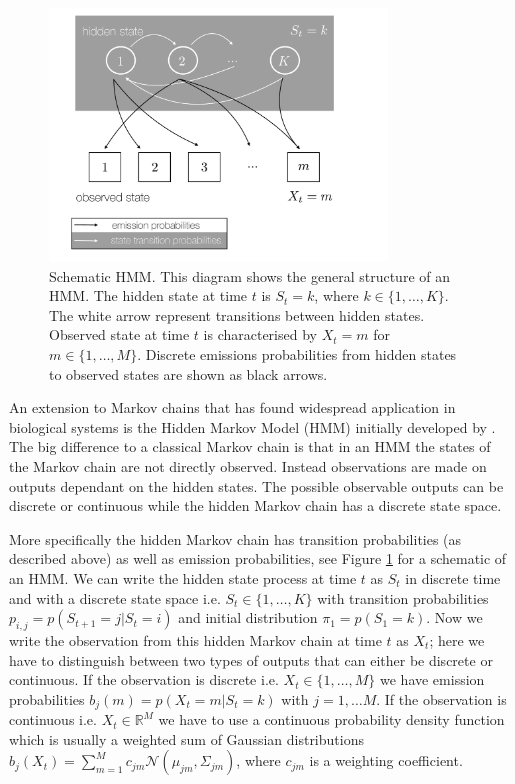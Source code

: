 \begin{figure}[!t]
\centering
\includegraphics[width=0.8\textwidth]{pics/hmm-schem.pdf}
\caption{Schematic HMM. This diagram shows the general structure of an HMM. The hidden state at time $t$ is $S_t=k$, where $k \in \{1, \ldots, K\}$. The white arrow represent transitions between hidden states. Observed state at time $t$ is characterised by $X_t =m $ for $m \in \{1, \ldots, M\}$. Discrete emissions probabilities from hidden states to observed states are shown as black arrows.}
\label{fig:hmm-schem}
\end{figure}

An extension to Markov chains that has found widespread application in biological systems is the Hidden Markov Model (HMM)  initially developed by \cite{Baum:1966cy}. The big difference to a classical Markov chain is that in an HMM the states of the Markov chain are not directly observed. Instead observations are made on outputs dependant on the hidden states. The possible observable outputs can be discrete or continuous while the hidden Markov chain has a discrete state space.

More specifically the hidden Markov chain has transition probabilities (as described above) as well as emission probabilities, see Figure \ref{fig:hmm-schem} for a schematic of an HMM. We can write the hidden state process at time $t$ as $S_t$ in discrete time and with a discrete state space i.e. $S_t \in \lbrace 1, \ldots, K \rbrace$ with transition probabilities $p_{i,j} = p(S_{t+1} =j | S_t =i)$ and initial distribution $\pi_1 = p(S_1 = k)$. Now we write the observation from this hidden Markov chain at time $t$ as $X_t$; here we have to distinguish between two types of outputs that can either be discrete or continuous. If the observation is discrete i.e. $X_t \in \lbrace 1, \ldots, M \rbrace$ we have emission probabilities  $b_j(m) = p(X_t = m | S_t = k)$ with $j = 1, \ldots M$. If the observation is continuous i.e. $X_t \in \mathbb{R}^M$ we have to use a continuous probability density function which is usually a weighted sum of Gaussian distributions $b_j(X_t) = \sum_{m=1}^M c_{jm}\mathcal{N}(\mu_{jm}, \Sigma_{jm})$, where $c_{jm}$ is a weighting coefficient.

